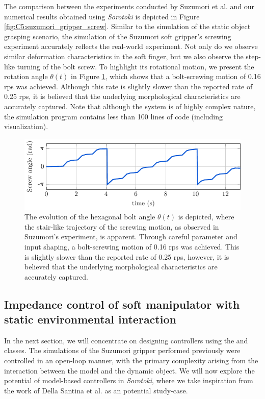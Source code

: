 The comparison between the experiments conducted by Suzumori et al. \cite{Suzumori1991,Suzumori1992} and our numerical results obtained using \textit{Sorotoki} is depicted in Figure \ref{fig:C5:suzumori_gripper_screw}. Similar to the simulation of the static object grasping scenario, the simulation of the Suzumori soft gripper's screwing experiment accurately reflects the real-world experiment. Not only do we observe similar deformation characteristics in the soft finger, but we also observe the step-like turning of the bolt screw. To highlight its rotational motion, we present the rotation angle $\theta(t)$ in Figure \ref{fig:C5:suzumori_gripper_screw_states}, which shows that a bolt-screwing motion of 0.16 rps was achieved. Although this rate is slightly slower than the reported rate of 0.25 rps, it is believed that the underlying morphological characteristics are accurately captured. Note that although the system is of highly complex nature, the simulation program contains less than 100 lines of code (including visualization).

%
\begin{figure}[!t]
    \centering
    \includegraphics*[width=.95\textwidth]{./pdf/thesis-figure-6-28.pdf}
    \caption{The evolution of the hexagonal bolt angle $\theta(t)$ is depicted, where the stair-like trajectory of the screwing motion, as observed in Suzumori's experiment, is apparent. Through careful parameter and input shaping, a bolt-screwing motion of 0.16 rps was achieved. This is slightly slower than the reported rate of 0.25 rps, however, it is believed that the underlying morphological characteristics are accurately captured.}
    \label{fig:C5:suzumori_gripper_screw_states}
\end{figure}

\subsection{Impedance control of soft manipulator with static environmental interaction}
In the next section, we will concentrate on designing controllers using the  and  classes. The simulations of the Suzumori gripper performed previously were controlled in an open-loop manner, with the primary complexity arising from the interaction between the model and the dynamic object. We will now explore the potential of model-based controllers in \textit{Sorotoki}, where we take inspiration from the work of Della Santina et al. \cite{DellaSantina2019Nov} as an potential study-case.

